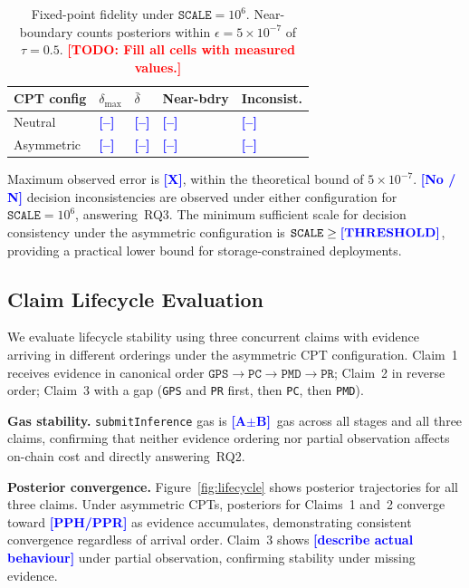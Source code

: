 \documentclass[journal]{IEEEtran}
\newcommand{\todo}[1]{\textcolor{red}{\textbf{[TODO: #1]}}}
\newcommand{\placeholder}[1]{\textcolor{blue}{\textbf{[#1]}}}
\begin{document}
\begin{table}[t]
\centering
\caption{Fixed-point fidelity under
$\texttt{SCALE}=10^6$.
Near-boundary counts posteriors within
$\epsilon=5{\times}10^{-7}$ of $\tau=0.5$.
\todo{Fill all cells with measured values.}}
\label{tab:fidelity}
\begin{tabularx}{\columnwidth}{lXXXX}
\toprule
\textbf{CPT config} &
$\delta_{\max}$ &
$\bar{\delta}$ &
\textbf{Near-bdry} &
\textbf{Inconsist.} \\
\midrule
Neutral    &
  \placeholder{--} & \placeholder{--} &
  \placeholder{--} & \placeholder{--} \\
Asymmetric &
  \placeholder{--} & \placeholder{--} &
  \placeholder{--} & \placeholder{--} \\
\bottomrule
\end{tabularx}
\end{table}

Maximum observed error is \placeholder{X}, within the
theoretical bound of $5\times10^{-7}$.
\placeholder{No / N} decision inconsistencies are
observed under either configuration for
$\texttt{SCALE}=10^6$, answering~RQ3.
The minimum sufficient scale for decision consistency
under the asymmetric configuration is
$\texttt{SCALE}\geq\placeholder{THRESHOLD}$, providing
a practical lower bound for storage-constrained
deployments.

\subsection{Claim Lifecycle Evaluation}
\label{sec:exp-lifecycle}

We evaluate lifecycle stability using three concurrent
claims with evidence arriving in different orderings
under the asymmetric CPT configuration.
Claim~1 receives evidence in canonical order
$\texttt{GPS}\to\texttt{PC}\to\texttt{PMD}\to
\texttt{PR}$; Claim~2 in reverse order; Claim~3 with
a gap (\texttt{GPS} and \texttt{PR} first, then
\texttt{PC}, then \texttt{PMD}).

\textbf{Gas stability.}
\texttt{submitInference} gas is
\placeholder{A$\pm$B}~gas across all stages and all
three claims, confirming that neither evidence
ordering nor partial observation affects on-chain cost
and directly answering~RQ2.

\textbf{Posterior convergence.}
Figure~\ref{fig:lifecycle} shows posterior
trajectories for all three claims. Under asymmetric
CPTs, posteriors for Claims~1 and~2 converge
toward \placeholder{PPH/PPR} as evidence accumulates,
demonstrating consistent convergence regardless of
arrival order. Claim~3 shows
\placeholder{describe actual behaviour} under partial
observation, confirming stability under missing
evidence.
\end{document}
